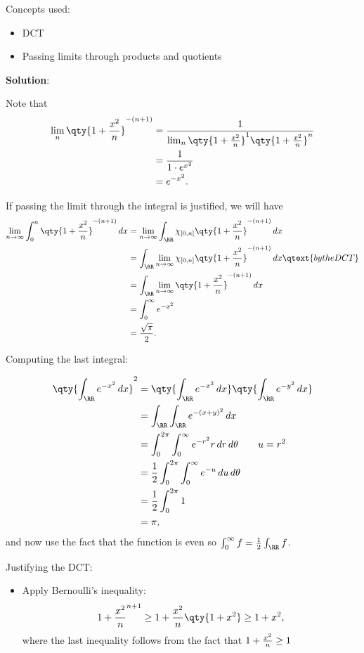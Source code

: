 \begin{solution}

Concepts used:

\begin{itemize}
\tightlist
\item
  DCT
\item
  Passing limits through products and quotients
\end{itemize}

\textbf{Solution}:

Note that
\begin{align*}
\lim_{n} \qty{1 + {x^2 \over n}}^{-(n+1)} 
&= {1 \over \lim_{n} \qty{1 + {x^2 \over n}}^1 \qty{1 + {x^2 \over n}}^n } \\
&= {1 \over 1 \cdot e^{x^2}} \\
&= e^{-x^2}
.\end{align*}

If passing the limit through the integral is justified, we will have
\begin{align*}
\lim_{n\to\infty} \int_0^n \qty{ 1 + {x^2\over n}}^{-(n+1)}\, dx 
&= \lim_{n\to\infty} \int_\RR \chi_{[0, n]} \qty{ 1 + {x^2\over n}}^{-(n+1)} \, dx  \\
&= \int_\RR \lim_{n\to\infty} \chi_{[0, n]} \qty{ 1 + {x^2\over n}}^{-(n+1)} \, dx  \qtext{by the DCT} \\
&= \int_\RR \lim_{n\to\infty} \qty{ 1 + {x^2\over n}}^{-(n+1)} \, dx  \\
&= \int_0^\infty e^{-x^2}  \\
&= {\sqrt \pi \over 2}
.\end{align*}

Computing the last integral:

\begin{align*}
\qty{\int_\RR e^{-x^2}\, dx}^2
&= \qty{\int_\RR e^{-x^2}\,dx} \qty{\int_\RR e^{-y^2}\,dx} \\
&= \int_\RR \int_\RR e^{-(x+y)^2}\, dx \\
&= \int_0^{2\pi} \int_0^\infty e^{-r^2} r\, dr \, d\theta \qquad u=r^2 \\
&= {1\over 2} \int_0^{2\pi } \int_0^\infty e^{-u}\, du \, d\theta \\
&= {1\over 2} \int_0^{2\pi} 1 \\
&= \pi
,\end{align*} and now use the fact that the function is even so
\(\int_0^\infty f = {1\over 2} \int_\RR f\).

Justifying the DCT:

\begin{itemize}
\tightlist
\item
  Apply Bernoulli's inequality:
  \begin{align*}
  {1 + {x^2\over n}}^{n+1} \geq {1 + {x^2\over n}}\qty{1 + x^2} \geq {1 + x^2}
  ,\end{align*} where the last inequality follows from the fact that
  \(1 + {x^2 \over n} \geq 1\)
\end{itemize}

\end{solution}

